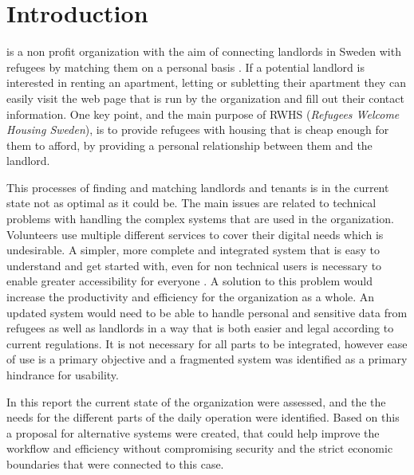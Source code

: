 

\section{Introduction}
 is a non profit organization with the aim of connecting landlords in Sweden with refugees by matching them on a personal basis \cite{Welcome}. If a potential landlord is interested in renting an apartment, letting or subletting their apartment they can easily visit the web page that is run by the organization and fill out their contact information. One key point, and the main purpose of RWHS (\textit{Refugees Welcome Housing Sweden}), is to provide refugees with housing that is cheap enough for them to afford, by providing a personal relationship between them and the landlord. 

This processes of finding and matching landlords and tenants is in the current state not as optimal as it could be. The main issues are related to technical problems with handling the complex systems that are used in the organization. Volunteers use multiple different services to cover their digital needs which is undesirable. A simpler, more complete and integrated system that is easy to understand and get started with, even for non technical users is necessary to enable greater accessibility for everyone . A solution to this problem would increase the productivity and efficiency for the organization as a whole. An updated system would need to be able to handle personal and sensitive data from refugees as well as landlords in a way that is both easier and legal according to current regulations. It is not necessary for all parts to be integrated, however ease of use is a primary objective and a fragmented system was identified as a primary hindrance for usability.

In this report the current state of the organization were assessed, and the the needs for the different parts of the daily operation were identified. Based on this a proposal for alternative systems were created, that could help improve the workflow and efficiency without compromising security and the strict economic boundaries that were connected to this case.

